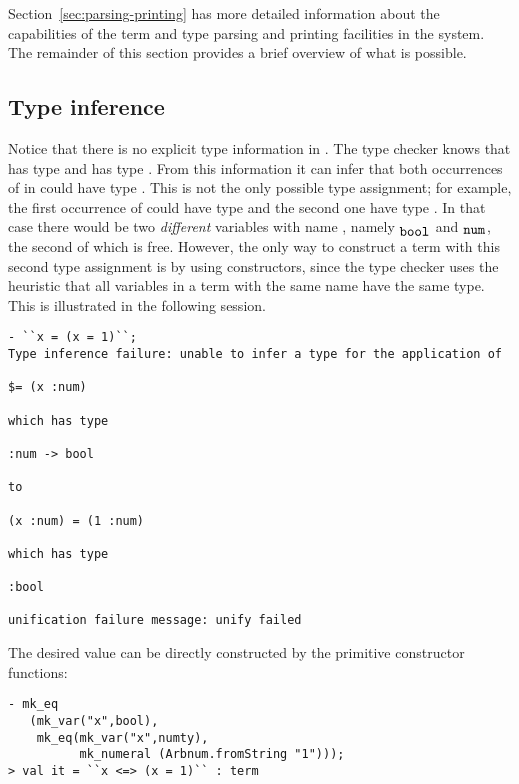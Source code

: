 Section~\ref{sec:parsing-printing} has more detailed information about
the capabilities of the term and type parsing and printing facilities
in the system.  The remainder of this section provides a brief
overview of what is possible.


\subsection{Type inference}
%
Notice that there is no explicit type information in
.  The \HOL{} type checker knows that  has
type  and \holtxt{+} has type .
From this information it can infer that both occurrences of  in
 could have type .  This is not the
only possible type assignment; for example, the first occurrence of
 could have type  and the second one have type
.  In that case there would be two \emph{different}
variables with name , namely $_{\holtxt{bool}}$ and
$_{\holtxt{num}\vphantom{l}}$, the second of which is free.  However, the
only way to construct a term with this second type assignment is by
using constructors, since the type checker uses the heuristic that all
variables in a term with the same name have the same type.  This is
illustrated in the following session.
%
\setcounter{sessioncount}{0}
\begin{session}
\begin{verbatim}
- ``x = (x = 1)``;
Type inference failure: unable to infer a type for the application of

$= (x :num)

which has type

:num -> bool

to

(x :num) = (1 :num)

which has type

:bool

unification failure message: unify failed
\end{verbatim}
\end{session}

The desired value can be directly constructed by the primitive constructor
functions:

\begin{session}
\begin{verbatim}
- mk_eq
   (mk_var("x",bool),
    mk_eq(mk_var("x",numty),
          mk_numeral (Arbnum.fromString "1")));
> val it = ``x <=> (x = 1)`` : term
\end{verbatim}
\end{session}

